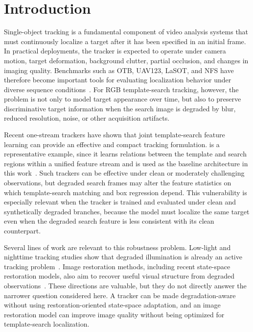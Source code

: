 \section{Introduction}

Single-object tracking is a fundamental component of video analysis systems that must continuously localize a target after it has been specified in an initial frame. In practical deployments, the tracker is expected to operate under camera motion, target deformation, background clutter, partial occlusion, and changes in imaging quality. Benchmarks such as OTB, UAV123, LaSOT, and NFS have therefore become important tools for evaluating localization behavior under diverse sequence conditions~\cite{wu2013otb,mueller2016uav123,fan2019lasot,galoogahi2017nfs}. For RGB template-search tracking, however, the problem is not only to model target appearance over time, but also to preserve discriminative target information when the search image is degraded by blur, reduced resolution, noise, or other acquisition artifacts.

Recent one-stream trackers have shown that joint template-search feature learning can provide an effective and compact tracking formulation. \baseline{} is a representative example, since it learns relations between the template and search regions within a unified feature stream and is used as the baseline architecture in this work~\cite{ye2022ostrack}. Such trackers can be effective under clean or moderately challenging observations, but degraded search frames may alter the feature statistics on which template-search matching and box regression depend. This vulnerability is especially relevant when the tracker is trained and evaluated under clean and synthetically degraded branches, because the model must localize the same target even when the degraded search feature is less consistent with its clean counterpart.

Several lines of work are relevant to this robustness problem. Low-light and nighttime tracking studies show that degraded illumination is already an active tracking problem~\cite{zhong2024llot,wu2024mambanut}. Image restoration methods, including recent state-space restoration models, also aim to recover useful visual structure from degraded observations~\cite{guo2024mambair,guo2025mambairv2}. These directions are valuable, but they do not directly answer the narrower question considered here. A tracker can be made degradation-aware without using restoration-oriented state-space adaptation, and an image restoration model can improve image quality without being optimized for template-search localization.

